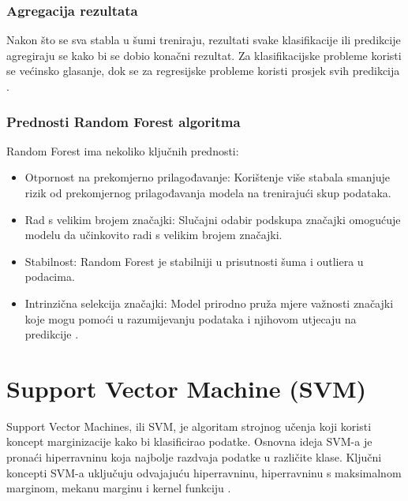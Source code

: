 \documentclass[zavrsnirad]{fer}
\begin{document}
\subsubsection{Agregacija rezultata}
Nakon što se sva stabla u šumi treniraju, rezultati svake klasifikacije ili predikcije agregiraju se kako bi se dobio konačni rezultat. Za klasifikacijske probleme koristi se većinsko glasanje, dok se za regresijske probleme koristi prosjek svih predikcija \cite{sarica2017}.

\subsubsection{Prednosti Random Forest algoritma}
Random Forest ima nekoliko ključnih prednosti:
\begin{itemize}
	\item Otpornost na prekomjerno prilagođavanje: Korištenje više stabala smanjuje rizik od prekomjernog prilagođavanja modela na trenirajući skup podataka.
	\item Rad s velikim brojem značajki: Slučajni odabir podskupa značajki omogućuje modelu da učinkovito radi s velikim brojem značajki.
	\item Stabilnost: Random Forest je stabilniji u prisutnosti šuma i outliera u podacima.
	\item Intrinzična selekcija značajki: Model prirodno pruža mjere važnosti značajki koje mogu pomoći u razumijevanju podataka i njihovom utjecaju na predikcije \cite{sarica2017}.
\end{itemize}


\section{Support Vector Machine (SVM)}
Support Vector Machines, ili SVM, je algoritam strojnog učenja koji koristi koncept marginizacije kako bi klasificirao podatke. Osnovna ideja SVM-a je pronaći hiperravninu koja najbolje razdvaja podatke u različite klase. Ključni koncepti SVM-a uključuju odvajajuću hiperravninu, hiperravninu s maksimalnom marginom, mekanu marginu i kernel funkciju \cite{fletcher2009}.
\end{document}
